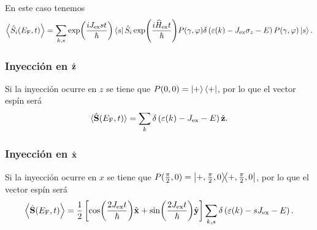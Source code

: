 En este caso tenemos
\begin{equation}\label{eq:S_EV:magZpre}
	\expval{\hat{S}_i(E_{\rm{F}},t)} = \sum_{k, s} \exp(\frac{i J_{\rm ex }s t}{\hbar}) \bra{ s}\hat{S}_i \exp(\frac{i\widehat{H}_{\rm ex}t}{\hbar})P(\gamma,\varphi) \delta\left (\varepsilon(k) -J_{\rm ex} \sigma_z  -E\right)P(\gamma,\varphi)\ket{s}.
\end{equation}

\subsubsection{Inyección en $ \hat{\vb z} $}
Si la inyección ocurre en $z$ se tiene que $P(0,0)=\ket{+}\bra{+}$, por lo que el vector espín será 
\begin{equation}
	\langle \hat{\vb{S} }(E_{\rm{F}},t) \rangle = \sum_k\delta\left (\varepsilon(k) -J_{\rm ex} -E\right) \hat{\vb z}.
\end{equation}

\subsubsection{Inyección en $ \hat{\vb x} $}
Si la inyección ocurre en $x$ se tiene que $P(\frac{\pi}{2},0) = \ketbra{+, \frac{\pi}{2}, 0}$, por lo que el vector espín será
\begin{equation}
	\expval{\hat{\vector{S}}(E_{\rm{F}},t)} = \frac{1}{2} \left[ \cos(\frac{2 J_{\rm ex } t}{\hbar}) \hat{\vector x} + \sin(\frac{2 J_{\rm ex } t}{\hbar}) \hat{\vector y} \right]  \smashoperator{\sum_{k, s}} \delta\left(\varepsilon(k) - sJ_{\rm ex} -E \right).
\end{equation}
